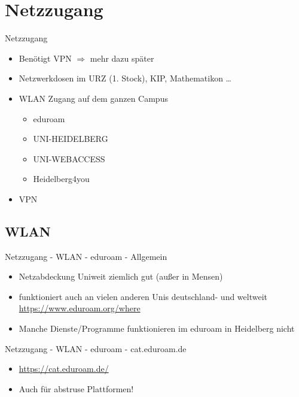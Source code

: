 \section{Netzzugang}
\begin{frame}{Netzzugang}
    \begin{itemize}
        \item Benötigt VPN $\Rightarrow$ mehr dazu später
        \item Netzwerkdosen im URZ (1. Stock), KIP, Mathematikon …
        \item WLAN Zugang auf dem ganzen Campus\pause
            \begin{itemize}
                \item eduroam
                \item UNI-HEIDELBERG
                \item UNI-WEBACCESS
                \item Heidelberg4you
            \end{itemize}\pause
        \item VPN
    \end{itemize}
\end{frame}

\subsection{WLAN}
\begin{frame}{Netzzugang - WLAN - eduroam - Allgemein}
    \begin{itemize}
        \item Netzabdeckung Uniweit ziemlich gut (außer in Mensen)
        \item funktioniert auch an vielen anderen Unis deutschland- und weltweit
            {\url{https://www.eduroam.org/where}}
        \item Manche Dienste/Programme funktionieren im eduroam in Heidelberg nicht
    \end{itemize}
\end{frame}

\begin{frame}{Netzzugang - WLAN - eduroam - cat.eduroam.de}
    \begin{itemize}
        \item \url{https://cat.eduroam.de/}
        \item Auch für abstruse Plattformen!
    \end{itemize}
    \begin{center}
    \end{center}
\end{frame}


